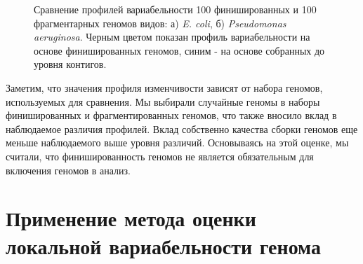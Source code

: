 \begin{figure}[!ht] 
  \center
  \caption{Сравнение профилей вариабельности 100 финишированных и 100 фрагментарных геномов видов: а) \textit{E. coli}, б) \textit{Pseudomonas aeruginosa}. Черным цветом показан профиль вариабельности на основе финишированных геномов, синим - на основе собранных до уровня контигов.}
  \label{img:compl_dr_coli} 
\end{figure}

Заметим, что значения профиля изменчивости зависят от набора геномов, используемых для сравнения. Мы выбирали случайные геномы в наборы финишированных и фрагментированных геномов, что также вносило вклад в наблюдаемое различия профилей. Вклад собственно качества сборки геномов еще меньше наблюдаемого выше уровня различий. Основываясь на этой оценке, мы считали, что финишированность геномов не является обязательным для включения геномов в анализ.

\section{Применение метода оценки локальной вариабельности генома}


